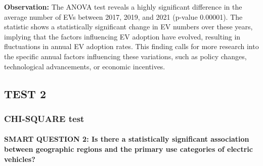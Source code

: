 \documentclass[
  letterpaper,
  DIV=11,
  numbers=noendperiod]{scrartcl}
\let\oldparagraph\paragraph
\renewcommand{\paragraph}[1]{\oldparagraph{#1}\mbox{}}
\begin{document}
\textbf{Observation:} The ANOVA test reveals a highly significant
difference in the average number of EVs between 2017, 2019, and 2021
(p-value 0.00001). The statistic shows a statistically significant
change in EV numbers over these years, implying that the factors
influencing EV adoption have evolved, resulting in fluctuations in
annual EV adoption rates. This finding calls for more research into the
specific annual factors influencing these variations, such as policy
changes, technological advancements, or economic incentives.

\hypertarget{test-2}{%
\subsection{TEST 2}\label{test-2}}

\hypertarget{chi-square-test}{%
\subsubsection{CHI-SQUARE test}\label{chi-square-test}}

\hypertarget{smart-question-2-is-there-a-statistically-significant-association-between-geographic-regions-and-the-primary-use-categories-of-electric-vehicles}{%
\paragraph{SMART QUESTION 2: Is there a statistically significant
association between geographic regions and the primary use categories of
electric
vehicles?}\label{smart-question-2-is-there-a-statistically-significant-association-between-geographic-regions-and-the-primary-use-categories-of-electric-vehicles}}
\end{document}
